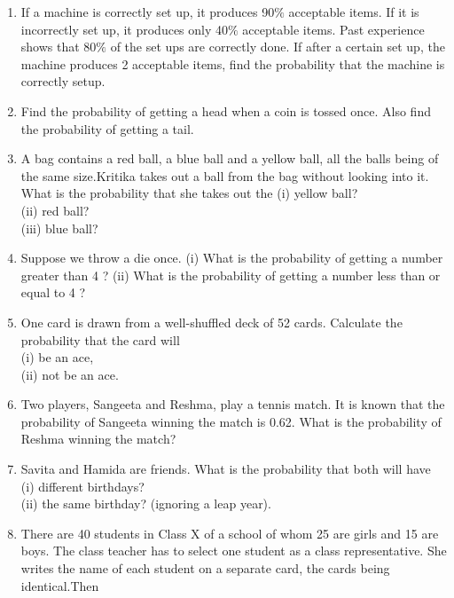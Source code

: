 \begin{enumerate}[label=\arabic*.,ref=\thesubsection.\theenumi]
\item If a machine is correctly set up, it produces 90$\%$ acceptable items. If it is
incorrectly set up, it produces only 40$\%$ acceptable items. Past experience shows that
80$\%$ of the set ups are correctly done. If after a certain set up, the machine produces 2 acceptable items, find the probability that the machine is correctly setup.
\\
\solution

\item Find the probability of getting a head when a coin is tossed once. Also
find the probability of getting a tail.
\\
\solution

\item A bag contains a red ball, a blue ball and a yellow ball, all the balls being
of the same size.Kritika takes out a ball from the bag without looking into it. What is the probability that she takes out the
(i) yellow ball? \\
(ii) red ball?\\
(iii) blue ball?
\\
\solution

\item Suppose we throw a die once. (i) What is the probability of getting a number greater than 4 ? (ii) What is the probability of getting a number less than or
equal to 4 ?
\\
\solution

\item One card is drawn from a well-shuffled deck of 52 cards. Calculate the
probability that the card will\\
(i) be an ace,\\
(ii) not be an ace.
\item Two players, Sangeeta and Reshma, play a tennis match. It is known
that the probability of Sangeeta winning the match is 0.62. What is the probability of
Reshma winning the match?
\item Savita and Hamida are friends. What is the probability that both will have \\
(i) different birthdays? \\
(ii) the same birthday? (ignoring a leap year).
\item There are 40 students in Class X of a school of whom 25 are girls and 15 are boys. The class teacher has to select one student as a class representative. She writes the name of each student on a separate card, the cards being identical.Then

\end{enumerate}
